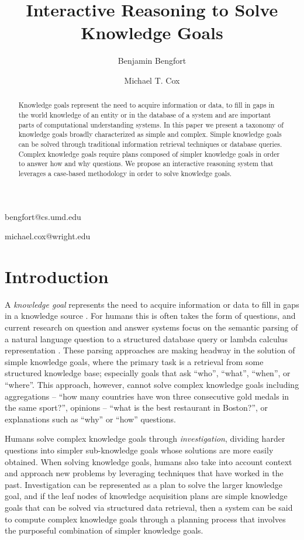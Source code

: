 \documentclass[11pt,letterpaper]{article}
\begin{document}
\title{Interactive Reasoning to Solve Knowledge Goals}

\author{Benjamin Bengfort}{bengfort@cs.umd.edu}
\address{Department of Computer Science, University of Maryland,
         College Park, MD 20742 USA}
\author{Michael T. Cox}{michael.cox@wright.edu}
\address{Wright State Research Institute,
         Beavercreek, OH 45431 USA}
\vskip 0.2in

\begin{abstract}
Knowledge goals represent the need to acquire information or data, to fill in gaps in the world knowledge of an entity or in the database of a system and are important parts of computational understanding systems. In this paper we present a taxonomy of knowledge goals broadly characterized as simple and complex. Simple knowledge goals can be solved through traditional information retrieval techniques or database queries. Complex knowledge goals require plans composed of simpler knowledge goals in order to answer how and why questions. We propose an interactive reasoning system that leverages a case-based methodology in order to solve knowledge goals.
\end{abstract}

\section{Introduction}

A \textit{knowledge goal} represents the need to acquire information or data to fill in gaps in a knowledge source \cite{ram_goal-based_1991}. For humans this is often takes the form of questions, and current research on question and answer systems focus on the semantic parsing of a natural language question to a structured database query or lambda calculus representation \cite{yahya_natural_2012,unger_template-based_2012,berant_semantic_2013}. These parsing approaches are making headway in the solution of simple knowledge goals, where the primary task is a retrieval from some structured knowledge base; especially goals that ask “who”, “what”, “when”, or “where”. This approach, however, cannot solve complex knowledge goals including aggregations – “how many countries have won three consecutive gold medals in the same sport?”, opinions – “what is the best restaurant in Boston?”, or explanations such as “why” or “how” questions.

Humans solve complex knowledge goals through \textit{investigation}, dividing harder questions into simpler sub-knowledge goals whose solutions are more easily obtained. When solving knowledge goals, humans also take into account context and approach new problems by leveraging techniques that have worked in the past. Investigation can be represented as a plan to solve the larger knowledge goal, and if the leaf nodes of knowledge acquisition plans are simple knowledge goals that can be solved via structured data retrieval, then a system can be said to compute complex knowledge goals through a planning process that involves the purposeful combination of simpler knowledge goals.
\end{document}
